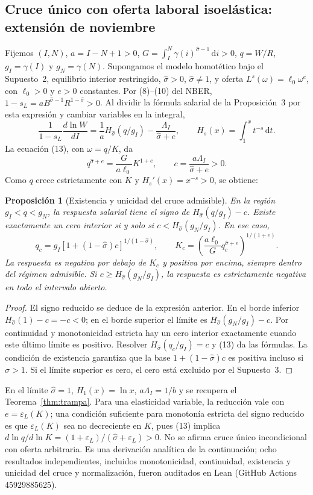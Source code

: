 \documentclass[11pt,a4paper]{article}
\numberwithin{equation}{section}
\theoremstyle{definition}
\theoremstyle{plain}
\newtheorem{proposicion}[definicion]{Proposición}
\theoremstyle{remark}
\newcommand{\eps}{\varepsilon}
\newcommand{\dd}{\,\mathrm{d}}
\newcommand{\sh}{\hat\sigma}
\begin{document}
\subsection{Cruce único con oferta laboral isoelástica: extensión de noviembre}
Fijemos $(I,N)$, $a=I-N+1>0$, $G=\int_I^N\gamma(i)^{\sh-1}\dd i>0$,
$q=W/R$, $g_I=\gamma(I)$ y $g_N=\gamma(N)$. Supongamos el modelo homotético bajo
el Supuesto~2, equilibrio interior restringido, $\sh>0$, $\sh\ne1$, y oferta
$L^s(\omega)=\ell_0\omega^e$, con $\ell_0>0$ y $e>0$ constantes.
Por (8)--(10) del NBER, $1-s_L=aB^{\sh-1}R^{1-\sh}>0$. Al dividir la fórmula salarial de
la Proposición~3 por esta expresión y cambiar variables en la integral,
\[
 \frac{1}{1-s_L}\frac{d\ln W}{dI}
 =\frac{1}{a}H_{\sh}(q/g_I)-\frac{\Lambda_I}{\sh+e},
 \qquad H_s(x)=\int_1^x t^{-s}\dd t .
\]
La ecuación (13), con $\omega=q/K$, da
\[
 q^{\sh+e}=\frac{G}{a\ell_0}K^{1+e},\qquad
 c=\frac{a\Lambda_I}{\sh+e}>0 .
\]
Como $q$ crece estrictamente con $K$ y $H_s'(x)=x^{-s}>0$, se obtiene:
\begin{proposicion}[Existencia y unicidad del cruce admisible]
En la región $g_I<q<g_N$, la respuesta salarial tiene el signo de $H_{\sh}(q/g_I)-c$.
Existe exactamente un cero interior si y solo si $c<H_{\sh}(g_N/g_I)$.
En ese caso,
\[
 q_c=g_I[1+(1-\sh)c]^{1/(1-\sh)},\qquad
 K_c=\left(\frac{a\ell_0}{G}q_c^{\sh+e}\right)^{1/(1+e)}.
\]
La respuesta es negativa por debajo de $K_c$ y positiva por encima, siempre dentro
del régimen admisible. Si $c\ge H_{\sh}(g_N/g_I)$, la respuesta es estrictamente negativa
en todo el intervalo abierto.
\end{proposicion}
\begin{proof}
El signo reducido se deduce de la expresión anterior. En el borde inferior
$H_{\sh}(1)-c=-c<0$; en el borde superior el límite es $H_{\sh}(g_N/g_I)-c$.
Por continuidad y monotonicidad estricta hay un cero interior exactamente cuando
este último límite es positivo. Resolver $H_{\sh}(q_c/g_I)=c$ y (13) da las fórmulas.
La condición de existencia garantiza que la base $1+(1-\sh)c$ es positiva incluso
si $\sh>1$. Si el límite superior es cero, el cero está excluido por el Supuesto~3.
\end{proof}
En el límite $\sh=1$, $H_1(x)=\ln x$, $a\Lambda_I=1/b$ y se recupera el Teorema~\ref{thm:trampa}.
Para una elasticidad variable, la reducción vale con $e=\eps_L(K)$; una condición suficiente
para monotonía estricta del signo reducido es que $\eps_L(K)$ sea no decreciente en $K$,
pues (13) implica $d\ln q/d\ln K=(1+\eps_L)/(\sh+\eps_L)>0$.
No se afirma cruce único incondicional con oferta arbitraria. Es una derivación analítica
de la continuación; ocho resultados independientes, incluidos monotonicidad, continuidad, existencia y unicidad del cruce y normalización, fueron auditados en Lean (GitHub Actions 45929885625).
\end{document}
